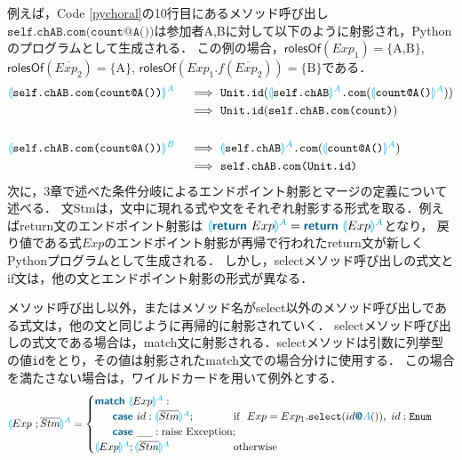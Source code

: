 \documentclass{thesis}
\newcommand{\projection}[2]{{\color{cyan}\llparenthesis}#1{\color{cyan}\rrparenthesis^#2}}
\newcommand{\mblue}[1]{\textbf{\textsf{\color{MidnightBlue}#1}}}
\newcommand{\cyan}[1]{\color{cyan}#1}
\begin{document}
例えば，Code \ref{pychoral}の10行目にあるメソッド呼び出し$\texttt{self.chAB.com(count@A())}$は参加者A,Bに対して以下のように射影され，Pythonのプログラムとして生成される．
この例の場合，$\textsf{rolesOf}(Exp_1) = \{\text{A,B}\}$, $\textsf{rolesOf}(\overline{Exp_2}) = \{\text{A}\}$, $\textsf{rolesOf}(Exp_1.f(\overline{Exp_2})) = \{\text{B}\}$である．
\begin{alignat*}{2} 
  &\projection{\texttt{self.chAB.com(count@A())}}{A} &&~\Longrightarrow~ \texttt{Unit.id}(\projection{\texttt{self.chAB}}{A}\texttt{.com}(\projection{\texttt{count@A()}}{A})) \\
  &&&~\Longrightarrow~ \texttt{Unit.id}(\texttt{self.chAB.com(count)})\\
  \\
  &\projection{\texttt{self.chAB.com(count@A())}}{B} &&~\Longrightarrow~ \projection{\texttt{self.chAB}}{A}\texttt{.com}(\projection{\texttt{count@A()}}{A}) \\
  &&&~\Longrightarrow~ \texttt{self.chAB.com(Unit.id)}\\
\end{alignat*}
次に，3章で述べた条件分岐によるエンドポイント射影とマージの定義について述べる．
文\textsf{Stm}は，文中に現れる式や文をそれぞれ射影する形式を取る．例えばreturn文のエンドポイント射影は
$\projection{\mblue{return} ~ Exp}{A} = \mblue{return} ~ \projection{Exp}{A}$となり，
戻り値である式$Exp$のエンドポイント射影が再帰で行われたreturn文が新しくPythonプログラムとして生成される．
しかし，\textsf{select}メソッド呼び出しの式文とif文は，他の文とエンドポイント射影の形式が異なる．

メソッド呼び出し以外，またはメソッド名が\textsf{select}以外のメソッド呼び出しである式文は，他の文と同じように再帰的に射影されていく．
\textsf{select}メソッド呼び出しの式文である場合は，\textsf{match}文に射影される．\textsf{select}メソッドは引数に列挙型の値\texttt{id}をとり，その値は射影されたmatch文での場合分けに使用する．
この場合を満たさない場合は，ワイルドカードを用いて例外とする．
\begin{alignat*}{2} 
  &\projection{Exp~;\overline{Stm}}{A} =
  \begin{cases}
    \mblue{match} ~\projection{Exp}{A}: \\
    ~~~~~\mblue{case} ~id: \projection{\overline{Stm}}{A};~~~~~~~~~~~ \text{if}~~Exp = Exp_1.\texttt{select}(id\mblue{@}{\cyan{A}}()),~ id:\texttt{Enum}\\ %
    ~~~~~\mblue{case} ~\_\_: \text{raise Exception}; \\
    \projection{Exp}{A};\projection{\overline{Stm}}{A} ~~~~~~~~~~~~~~~~~~ \text{otherwise}\\
  \end{cases}
\end{alignat*}
\end{document}
